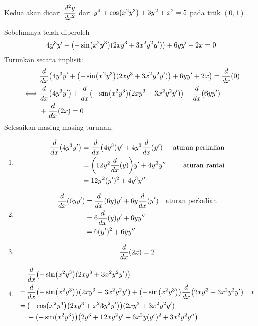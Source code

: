 \begin{enumerate}[leftmargin=*, label={\arabic*}.]
\begin{enumerate}[label={\alph*}.]
    Kedua akan dicari $\displaystyle\frac{d^{2}y}{dx^{2}}$ dari 
    $y^{4}+\cos\brk*{x^{2}y^{3}}+3y^{2}+x^{2}=5$ pada titik $(0,1)$.

    Sebelumnya telah diperoleh
    \[
    4y^{3}y'+\brk*{-\sin\brk*{x^{2}y^{3}}(2xy^{3}+3x^{2}y^{2}y')}+6yy'+2x=0
    \]
    Turunkan secara implisit:
    \begin{align*}
        &\drv{x}{4y^{3}y'
        +\brk*{-\sin\brk*{x^{2}y^{3}}(2xy^{3}+3x^{2}y^{2}y')}+6yy'+2x}=
        \drv{x}{0}\\
        \iff &\drv{x}{4y^{3}y'}+\drv{x}{-\sin\brk*{x^{2}y^{3}}(2xy^{3}+3x^{2}y^{2}y')}
        +\drv{x}{6yy'}\\
        &+\drv{x}{2x}=0
    \end{align*}
    Selesaikan masing-masing turunan:
        \begin{enumerate}[label={\arabic*})]
        \item \begin{align*}
            \drv{x}{4y^{3}y'} &= \drv{x}{4y^{3}}y' + 4y^{3}\drv{x}{y'}
            &\text{aturan perkalian}\\
            &=\brk*{12y^{2}\drv{x}{y}}y'+4y^{3}y''
            &\text{aturan rantai}\\
            &=12y^{2}(y')^{2}+4y^{3}y''
        \end{align*}
        \item \begin{align*}
            \drv{x}{6yy'} &= \drv{x}{6y}y'+6y\drv{x}{y'}
            &\text{aturan perkalian}\\
            &=6\drv{x}{y}y'+6yy'' \\
            &= 6(y')^{2}+6yy''
        \end{align*}
        \item \[
        \drv{x}{2x} = 2
        \]
        \item \begin{align*}
            &\drv{x}{-\sin\brk*{x^{2}y^{3}}(2xy^{3}+3x^{2}y^{2}y')}\\
            =\,&\drv{x}{-\sin\brk*{x^{2}y^{3}}}(2xy^{3}+3x^{2}y^{2}y')
            +\brk*{-\sin\brk*{x^{2}y^{3}}}\drv{x}{2xy^{3}+3x^{2}y^{2}y'}
            \quad *\\
            =\,&\brk*{-\cos\brk*{x^{2}y^{3}}\brk*{2xy^{3}+x^{2}3y^{2}y'}}
            (2xy^{3}+3x^{2}y^{2}y')\\
            &+\brk*{-\sin\brk*{x^{2}y^{3}}}
            \brk*{2y^{3}+12xy^{2}y'+6x^{2}y(y')^{2}+3x^{2}y^{2}y''}\\

\end{align*}
\end{enumerate}
\end{enumerate}
\end{enumerate}
